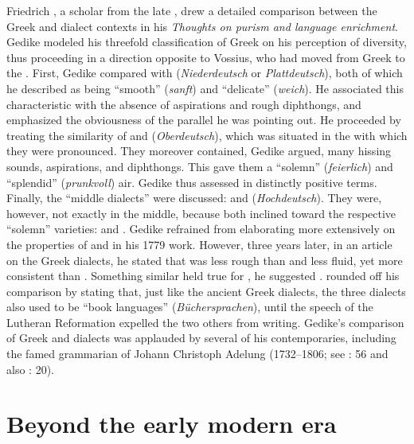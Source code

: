 Friedrich \citet[\textsc{xx}]{Gedike1779}, a  scholar from the late , drew a detailed comparison between the Greek and  dialect contexts in his \textit{Thoughts on purism and language enrichment}. Gedike modeled his threefold classification of Greek on his perception of   diversity, thus proceeding in a direction opposite to Vossius, who had moved from Greek to the . First, Gedike compared  with  (\textit{Niederdeutsch} or \textit{Plattdeutsch}), both of which he described as being “smooth” (\textit{sanft}) and “delicate” (\textit{weich}). He associated this characteristic with the absence of aspirations and rough diphthongs, and emphasized the obviousness of the parallel he was pointing out. He proceeded by treating the similarity of  and  (\textit{Oberdeutsch}), which was situated in the  with which they were pronounced. They moreover contained, Gedike argued, many hissing sounds, aspirations, and diphthongs. This gave them a “solemn” (\textit{feierlich}) and “splendid” (\textit{prunkvoll}) air. Gedike thus assessed  in distinctly positive terms. Finally, the “middle dialects” were discussed:  and  (\textit{Hochdeutsch}). They were, however, not exactly in the middle, because both inclined toward the respective “solemn” varieties:  and . Gedike refrained from elaborating more extensively on the properties of  and  in his 1779 work. However, three years later, in an article on the Greek dialects, he stated that  was less rough than  and less fluid, yet more consistent than . Something similar held true for , he suggested \citep[25]{Gedike1782}. \citet[\textsc{xx–xxi}]{Gedike1779} rounded off his comparison by stating that, just like the ancient Greek dialects, the three  dialects also used to be “book languages” (\textit{Büchersprachen}), until the  speech of the Lutheran Reformation expelled the two others from writing. Gedike’s comparison of Greek and  dialects was applauded by several of his contemporaries, including the famed grammarian of  Johann Christoph Adelung (1732–1806; see \citealt{Adelung1781}: 56 and also \citealt{Moritz1781}: 20).

\section{Beyond the early modern era}\label{sec:7.4}


